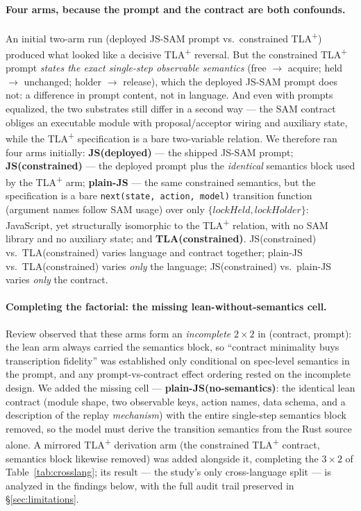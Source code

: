 \documentclass[11pt]{article}
\newcommand{\jssam}{JS-SAM}
\newcommand{\tlaplus}{TLA\texorpdfstring{\textsuperscript{+}}{+}}
\begin{document}
\paragraph{Four arms, because the prompt and the contract are both confounds.}
An initial two-arm run (deployed \jssam{} prompt vs.\ constrained \tlaplus{})
produced what looked like a decisive \tlaplus{} reversal. But the constrained
\tlaplus{} prompt \emph{states the exact single-step observable semantics}
(free $\to$ acquire; held $\to$ unchanged; holder $\to$ release), which the
deployed \jssam{} prompt does not: a difference in prompt content, not in
language. And even with prompts equalized, the two substrates still differ in
a second way --- the SAM contract obliges an executable module with
proposal/acceptor wiring and auxiliary state, while the \tlaplus{}
specification is a bare two-variable relation. We therefore ran four arms
initially:
\textbf{JS(deployed)} --- the shipped \jssam{} prompt;
\textbf{JS(constrained)} --- the deployed prompt plus the \emph{identical}
semantics block used by the \tlaplus{} arm;
\textbf{plain-JS} --- the same constrained semantics, but the specification
is a bare \texttt{next(state, action, model)} transition function
(argument names follow SAM usage) over only
$\{\mathit{lockHeld}, \mathit{lockHolder}\}$: JavaScript, yet structurally
isomorphic to the \tlaplus{} relation, with no SAM library and no auxiliary
state; and \textbf{TLA(constrained)}. JS(constrained) vs.\ TLA(constrained)
varies language and contract together; plain-JS vs.\ TLA(constrained) varies
\emph{only} the language; JS(constrained) vs.\ plain-JS varies \emph{only}
the contract.

\paragraph{Completing the factorial: the missing lean-without-semantics cell.}
Review observed that these arms form an \emph{incomplete} $2{\times}2$ in
(contract, prompt): the lean arm always carried the semantics block, so
``contract minimality buys transcription fidelity'' was established only
conditional on spec-level semantics in the prompt, and any
prompt-vs-contract effect ordering rested on the incomplete design. We added
the missing cell --- \textbf{plain-JS(no-semantics)}: the identical lean
contract (module shape, two observable keys, action names, data schema, and
a description of the replay \emph{mechanism}) with the entire single-step
semantics block removed, so the model must derive the transition semantics
from the Rust source alone. A mirrored \tlaplus{} derivation arm (the
constrained \tlaplus{} contract, semantics block likewise removed) was added
alongside it, completing the $3{\times}2$ of Table~\ref{tab:crosslang}; its
result --- the study's only cross-language split --- is analyzed in the
findings below, with the full audit trail preserved in
\S\ref{sec:limitations}.
\end{document}
